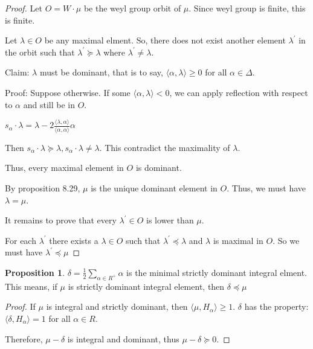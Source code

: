 \documentclass{article}
\theoremstyle{definition}
\newtheorem{proposition}{Proposition}
\begin{document}
\begin{proof}
    Let \(O = W\cdot\mu\) be the weyl group orbit of \(\mu \). Since weyl group is finite, this is finite.

    Let \(\lambda\in O\) be any maximal elment. So, there does not exist another element \(\lambda ^{\prime} \) in the orbit such that \(\lambda ^{\prime} \succeq \lambda\) where \(\lambda ^{\prime} \neq \lambda\).

    Claim: \(\lambda\) must be dominant, that is to say, \(\langle \alpha,\lambda \rangle \geq 0\) for all \(\alpha \in \Delta\).

    Proof: Suppose otherwise. If some \(\langle \alpha ,\lambda \rangle < 0\), we can apply reflection with respect to \(\alpha\) and still be in \(O\).

    \(s_\alpha \cdot \lambda = \lambda - 2 \frac{\langle \lambda ,\alpha  \rangle }{\langle \alpha ,\alpha  \rangle }\alpha \) 

    Then \(s_\alpha \cdot \lambda \succeq \lambda, s_\alpha \cdot \lambda \neq \lambda\). This contradict the maximality of \(\lambda\).

    Thus, every maximal element in \(O\) is dominant.

    By proposition 8.29, \(\mu\) is the unique dominant element in \(O\). Thus, we must have \(\lambda = \mu\).

    It remains to prove that every \(\lambda^{\prime} \in O\) is lower than \(\mu\).

    For each \(\lambda^{\prime}\) there exists a \(\lambda \in O\) such that \(\lambda ^{\prime} \preceq \lambda\) and \(\lambda\) is maximal in \(O\).  So we must have \(\lambda ^{\prime} \preceq \mu \) 

\end{proof}

\begin{proposition}
    \(\delta = \frac{1}{2} \sum_{\alpha \in R^+} \alpha \) is the minimal strictly dominant integral elment. This means, if \(\mu\) is strictly dominant integral element, then \(\delta \preceq \mu\)
\end{proposition}

\begin{proof}
    If \(\mu\) is integral and strictly dominant, then \(\langle \mu, H_\alpha \rangle \geq 1\). \(\delta\) has the property: \(\langle \delta , H_\alpha \rangle = 1\) for all \(\alpha\in R\).
    
    Therefore, \(\mu - \delta\) is integral and dominant, thus \(\mu - \delta \succeq 0\).

\end{proof}
\end{document}
